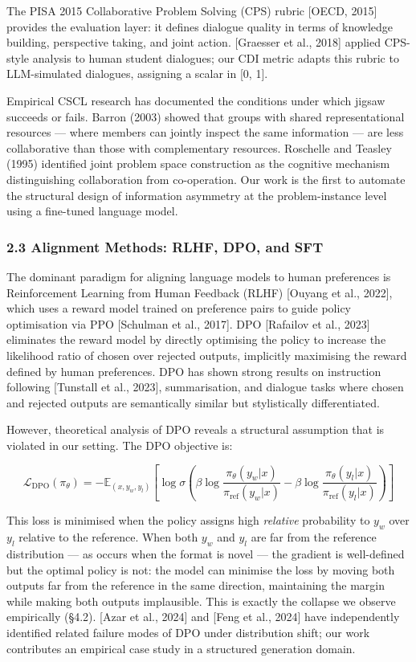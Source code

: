 \documentclass[
  11pt,
]{article}
\begin{document}
The PISA 2015 Collaborative Problem Solving (CPS) rubric {[}OECD,
2015{]} provides the evaluation layer: it defines dialogue quality in
terms of knowledge building, perspective taking, and joint action.
[Graesser et al., 2018] applied CPS-style analysis to human
student dialogues; our CDI metric adapts this rubric to LLM-simulated
dialogues, assigning a scalar in {[}0, 1{]}.

Empirical CSCL research has documented the conditions under which jigsaw
succeeds or fails. Barron (2003) showed that groups with shared
representational resources --- where members can jointly inspect the
same information --- are less collaborative than those with
complementary resources. Roschelle and Teasley (1995) identified joint
problem space construction as the cognitive mechanism distinguishing
collaboration from co-operation. Our work is the first to automate the
structural design of information asymmetry at the problem-instance level
using a fine-tuned language model.

\subsubsection{2.3 Alignment Methods: RLHF, DPO, and
SFT}\label{alignment-methods-rlhf-dpo-and-sft}

The dominant paradigm for aligning language models to human preferences
is Reinforcement Learning from Human Feedback (RLHF) {[}Ouyang et al.,
2022{]}, which uses a reward model trained on preference pairs to guide
policy optimisation via PPO [Schulman et al., 2017]. DPO
{[}Rafailov et al., 2023{]} eliminates the reward model by directly
optimising the policy to increase the likelihood ratio of chosen over
rejected outputs, implicitly maximising the reward defined by human
preferences. DPO has shown strong results on instruction following
[Tunstall et al., 2023], summarisation, and dialogue tasks
where chosen and rejected outputs are semantically similar but
stylistically differentiated.

However, theoretical analysis of DPO reveals a structural assumption
that is violated in our setting. The DPO objective is:

\[\mathcal{L}_\text{DPO}(\pi_\theta) = -\mathbb{E}_{(x, y_w, y_l)}\left[\log \sigma\left(\beta \log \frac{\pi_\theta(y_w|x)}{\pi_\text{ref}(y_w|x)} - \beta \log \frac{\pi_\theta(y_l|x)}{\pi_\text{ref}(y_l|x)}\right)\right]\]

This loss is minimised when the policy assigns high \emph{relative}
probability to \(y_w\) over \(y_l\) relative to the reference. When both
\(y_w\) and \(y_l\) are far from the reference distribution --- as
occurs when the format is novel --- the gradient is well-defined but the
optimal policy is not: the model can minimise the loss by moving both
outputs far from the reference in the same direction, maintaining the
margin while making both outputs implausible. This is exactly the
collapse we observe empirically (§4.2). [Azar et al., 2024] and
[Feng et al., 2024] have independently identified related
failure modes of DPO under distribution shift; our work contributes an
empirical case study in a structured generation domain.
\end{document}
